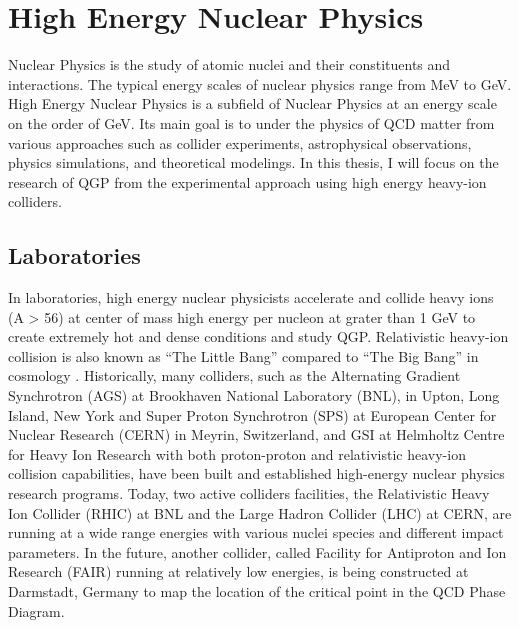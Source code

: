 






\section{High Energy Nuclear Physics}

Nuclear Physics is the study of atomic nuclei and their constituents and interactions. The typical energy scales of nuclear physics range from MeV to GeV. High Energy Nuclear Physics is a subfield of Nuclear Physics at an energy scale on the order of GeV. Its main goal is to under the physics of QCD matter from various approaches such as collider experiments, astrophysical observations, physics simulations, and theoretical modelings. In this thesis, I will focus on the research of QGP from the experimental approach using high energy heavy-ion colliders.

\subsection{Laboratories}

In laboratories, high energy nuclear physicists accelerate and collide heavy ions (A > 56) at center of mass high energy per nucleon at grater than 1 GeV to create extremely hot and dense conditions and study QGP. Relativistic heavy-ion collision is also known as ``The Little Bang'' compared to ``The Big Bang'' in cosmology \cite{LittleBang}. Historically, many colliders, such as the Alternating Gradient Synchrotron (AGS) at Brookhaven National Laboratory (BNL), in Upton, Long Island, New York and Super Proton Synchrotron (SPS) at European Center for Nuclear Research (CERN) in Meyrin, Switzerland, and GSI at Helmholtz Centre for Heavy Ion Research with both proton-proton and relativistic heavy-ion collision capabilities, have been built and established high-energy nuclear physics research programs. Today, two active colliders facilities, the Relativistic Heavy Ion Collider (RHIC) at BNL and the Large Hadron Collider (LHC) at CERN, are running at a wide range energies with various nuclei species and different impact parameters. In the future, another collider, called Facility for Antiproton and Ion Research (FAIR) running at relatively low energies, is being constructed at Darmstadt, Germany to map the location of the critical point in the QCD Phase Diagram. 

